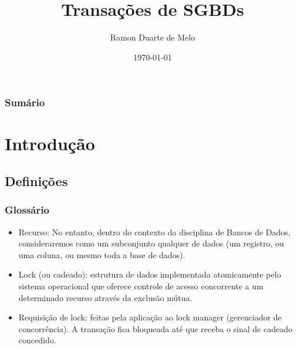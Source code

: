 \documentclass{beamer}
\title[Transações]{Transações de SGBDs} %
\author{Ramon Duarte de Melo} %
\institute[UFRJ] %
    {
    Universidade Federal do Rio de Janeiro \\ %
    \medskip
    \textit{ramonduarte@poli.ufrj.br} %
    }
\date{\today} %
\begin{document}
    \begin{frame}
        \titlepage %
    \end{frame}

    \begin{frame}
        \frametitle{Sumário} %
        \tableofcontents %
\end{frame}


\section{Introdução} %

\subsection{Definições} %

\begin{frame}
\frametitle{Glossário}
    \begin{itemize}
        \item Recurso: No entanto, dentro do contexto da disciplina de Bancos de Dados, consideraremos como um subconjunto qualquer de dados (um registro, ou uma coluna, ou mesmo toda a base de dados). 
        \item Lock (ou cadeado): estrutura de dados implementada atomicamente pelo sistema operacional que oferece controle de acesso concorrente a um determinado recurso através da exclusão mútua.
        \item Requisição de lock: feitas pela aplicação ao lock manager (gerenciador de concorrência). A transação fica bloqueada até que receba o sinal de cadeado concedido.
    \end{itemize}
\end{frame}
\end{document}
